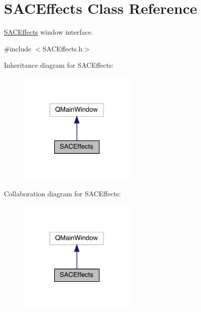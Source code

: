 \hypertarget{class_s_a_c_effects}{}\section{S\+A\+C\+Effects Class Reference}
\label{class_s_a_c_effects}


\hyperlink{class_s_a_c_effects}{S\+A\+C\+Effects} window interface.  




{\ttfamily \#include $<$S\+A\+C\+Effects.\+h$>$}



Inheritance diagram for S\+A\+C\+Effects\+:
\nopagebreak
\begin{figure}[H]
\begin{center}
\leavevmode
\includegraphics[width=162pt]{class_s_a_c_effects__inherit__graph}
\end{center}
\end{figure}


Collaboration diagram for S\+A\+C\+Effects\+:
\nopagebreak
\begin{figure}[H]
\begin{center}
\leavevmode
\includegraphics[width=162pt]{class_s_a_c_effects__coll__graph}
\end{center}
\end{figure}

